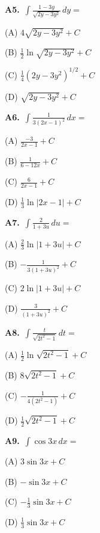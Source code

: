 \documentclass[11pt]{article}
\begin{document}
\bigskip\noindent\textbf{A5.}\ $\displaystyle\int \frac{1-3y}{\sqrt{2y-3y^2}}\,dy=$
\begin{list}{}{\setlength{\leftmargin}{3em}\setlength{\labelwidth}{2.5em}\setlength{\itemsep}{0pt}\setlength{\topsep}{2pt}}
\item[(A)] $4\sqrt{2y-3y^2}+C$
\item[(B)] $\frac12\ln\sqrt{2y-3y^2}+C$
\item[(C)] $\frac14(2y-3y^2)^{1/2}+C$
\item[(D)] $\sqrt{2y-3y^2}+C$
\end{list}

\bigskip\noindent\textbf{A6.}\ $\displaystyle\int \frac1{3(2x-1)^2}\,dx=$
\begin{list}{}{\setlength{\leftmargin}{3em}\setlength{\labelwidth}{2.5em}\setlength{\itemsep}{0pt}\setlength{\topsep}{2pt}}
\item[(A)] $\frac{-3}{2x-1}+C$
\item[(B)] $\frac1{6-12x}+C$
\item[(C)] $\frac6{2x-1}+C$
\item[(D)] $\frac13\ln\lvert2x-1\rvert+C$
\end{list}

\bigskip\noindent\textbf{A7.}\ $\displaystyle\int \frac2{1+3u}\,du=$
\begin{list}{}{\setlength{\leftmargin}{3em}\setlength{\labelwidth}{2.5em}\setlength{\itemsep}{0pt}\setlength{\topsep}{2pt}}
\item[(A)] $\frac23\ln\lvert1+3u\rvert+C$
\item[(B)] $-\frac1{3(1+3u)^2}+C$
\item[(C)] $2\ln\lvert1+3u\rvert+C$
\item[(D)] $\frac3{(1+3u)^2}+C$
\end{list}

\bigskip\noindent\textbf{A8.}\ $\displaystyle\int \frac{t}{\sqrt{2t^2-1}}\,dt=$
\begin{list}{}{\setlength{\leftmargin}{3em}\setlength{\labelwidth}{2.5em}\setlength{\itemsep}{0pt}\setlength{\topsep}{2pt}}
\item[(A)] $\frac12\ln\sqrt{2t^2-1}+C$
\item[(B)] $8\sqrt{2t^2-1}+C$
\item[(C)] $-\frac1{4(2t^2-1)}+C$
\item[(D)] $\frac12\sqrt{2t^2-1}+C$
\end{list}

\bigskip\noindent\textbf{A9.}\ $\displaystyle\int \cos3x\,dx=$
\begin{list}{}{\setlength{\leftmargin}{3em}\setlength{\labelwidth}{2.5em}\setlength{\itemsep}{0pt}\setlength{\topsep}{2pt}}
\item[(A)] $3\sin3x+C$
\item[(B)] $-\sin3x+C$
\item[(C)] $-\frac13\sin3x+C$
\item[(D)] $\frac13\sin3x+C$
\end{list}
\end{document}
